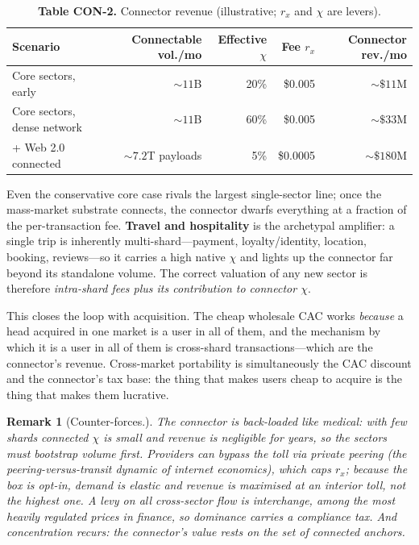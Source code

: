 \documentclass[11pt]{article}
\newtheorem{remark}{Remark}
\begin{document}
\begin{table}[h]
\centering
\caption*{\textbf{Table CON-2.} Connector revenue (illustrative; $r_x$ and $\chi$ are levers).}
\begin{tabular}{@{}lrrrr@{}}
\toprule
Scenario & Connectable vol./mo & Effective $\chi$ & Fee $r_x$ & Connector rev./mo \\
\midrule
Core sectors, early        & ${\sim}11$B   & 20\% & \$0.005  & ${\sim}\$11$M \\
Core sectors, dense network & ${\sim}11$B   & 60\% & \$0.005  & ${\sim}\$33$M \\
+ Web 2.0 connected        & ${\sim}7.2$T payloads & 5\% & \$0.0005 & ${\sim}\$180$M \\
\bottomrule
\end{tabular}
\end{table}

Even the conservative core case rivals the largest single-sector line; once the mass-market substrate connects, the connector dwarfs everything at a fraction of the per-transaction fee. \textbf{Travel and hospitality} is the archetypal amplifier: a single trip is inherently multi-shard---payment, loyalty/identity, location, booking, reviews---so it carries a high native $\chi$ and lights up the connector far beyond its standalone volume. The correct valuation of any new sector is therefore \emph{intra-shard fees plus its contribution to connector $\chi$}.

This closes the loop with acquisition. The cheap wholesale CAC works \emph{because} a head acquired in one market is a user in all of them, and the mechanism by which it is a user in all of them is cross-shard transactions---which are the connector's revenue. Cross-market portability is simultaneously the CAC discount and the connector's tax base: the thing that makes users cheap to acquire is the thing that makes them lucrative.

\begin{remark}[Counter-forces.]
The connector is back-loaded like medical: with few shards connected $\chi$ is small and revenue is negligible for years, so the sectors must bootstrap volume first. Providers can bypass the toll via private peering (the peering-versus-transit dynamic of internet economics), which caps $r_x$; because the box is opt-in, demand is elastic and revenue is maximised at an interior toll, not the highest one. A levy on all cross-sector flow is interchange, among the most heavily regulated prices in finance, so dominance carries a compliance tax. And concentration recurs: the connector's value rests on the set of connected anchors.
\end{remark}
\end{document}

